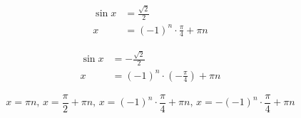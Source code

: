 \documentclass{article}
\begin{document}
\begin{itemize}
\begin{minipage}[t]{.33\textwidth}
\begin{gather*}
		\end{gather*}
	\end{minipage}
	\begin{minipage}[t]{.33\textwidth}
		\begin{align*}
			\sin x&=\frac{\sqrt{2}}{2} \\
			x&=\left(-1\right)^n\cdot\frac{\pi}{4}+\pi n
		\end{align*}
	\end{minipage}
	\begin{minipage}[t]{.33\textwidth}
		\begin{align*}
			\sin x&=-\frac{\sqrt{2}}{2} \\
			x&=\left(-1\right)^n\cdot\left(-\frac{\pi}{4}
				\right)+\pi n
		\end{align*}
	\end{minipage}
	\[
		\boxed{x=\pi n,\,
			x=\frac{\pi}{2}+\pi n,\,
			x=\left(-1\right)^n\cdot\frac{\pi}{4}+\pi n,\,
			x=-\left(-1\right)^n\cdot\frac{\pi}{4}+\pi n}
	\]
\end{itemize}
\end{document}
